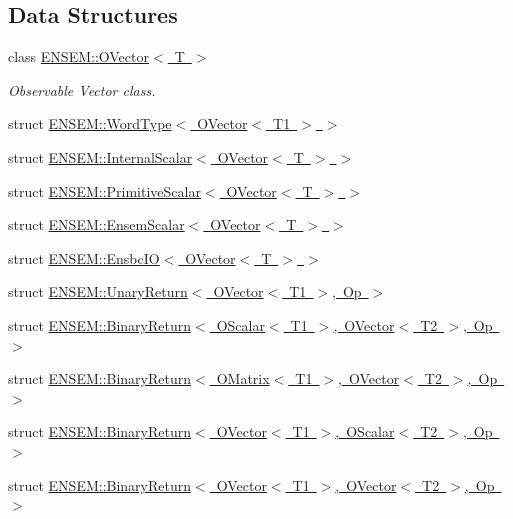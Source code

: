 \subsection*{Data Structures}
\begin{DoxyCompactItemize}
\item 
class \mbox{\hyperlink{classENSEM_1_1OVector}{E\+N\+S\+E\+M\+::\+O\+Vector$<$ T $>$}}
\begin{DoxyCompactList}\small\item\em Observable Vector class. \end{DoxyCompactList}\item 
struct \mbox{\hyperlink{structENSEM_1_1WordType_3_01OVector_3_01T1_01_4_01_4}{E\+N\+S\+E\+M\+::\+Word\+Type$<$ O\+Vector$<$ T1 $>$ $>$}}
\item 
struct \mbox{\hyperlink{structENSEM_1_1InternalScalar_3_01OVector_3_01T_01_4_01_4}{E\+N\+S\+E\+M\+::\+Internal\+Scalar$<$ O\+Vector$<$ T $>$ $>$}}
\item 
struct \mbox{\hyperlink{structENSEM_1_1PrimitiveScalar_3_01OVector_3_01T_01_4_01_4}{E\+N\+S\+E\+M\+::\+Primitive\+Scalar$<$ O\+Vector$<$ T $>$ $>$}}
\item 
struct \mbox{\hyperlink{structENSEM_1_1EnsemScalar_3_01OVector_3_01T_01_4_01_4}{E\+N\+S\+E\+M\+::\+Ensem\+Scalar$<$ O\+Vector$<$ T $>$ $>$}}
\item 
struct \mbox{\hyperlink{structENSEM_1_1EnsbcIO_3_01OVector_3_01T_01_4_01_4}{E\+N\+S\+E\+M\+::\+Ensbc\+I\+O$<$ O\+Vector$<$ T $>$ $>$}}
\item 
struct \mbox{\hyperlink{structENSEM_1_1UnaryReturn_3_01OVector_3_01T1_01_4_00_01Op_01_4}{E\+N\+S\+E\+M\+::\+Unary\+Return$<$ O\+Vector$<$ T1 $>$, Op $>$}}
\item 
struct \mbox{\hyperlink{structENSEM_1_1BinaryReturn_3_01OScalar_3_01T1_01_4_00_01OVector_3_01T2_01_4_00_01Op_01_4}{E\+N\+S\+E\+M\+::\+Binary\+Return$<$ O\+Scalar$<$ T1 $>$, O\+Vector$<$ T2 $>$, Op $>$}}
\item 
struct \mbox{\hyperlink{structENSEM_1_1BinaryReturn_3_01OMatrix_3_01T1_01_4_00_01OVector_3_01T2_01_4_00_01Op_01_4}{E\+N\+S\+E\+M\+::\+Binary\+Return$<$ O\+Matrix$<$ T1 $>$, O\+Vector$<$ T2 $>$, Op $>$}}
\item 
struct \mbox{\hyperlink{structENSEM_1_1BinaryReturn_3_01OVector_3_01T1_01_4_00_01OScalar_3_01T2_01_4_00_01Op_01_4}{E\+N\+S\+E\+M\+::\+Binary\+Return$<$ O\+Vector$<$ T1 $>$, O\+Scalar$<$ T2 $>$, Op $>$}}
\item 
struct \mbox{\hyperlink{structENSEM_1_1BinaryReturn_3_01OVector_3_01T1_01_4_00_01OVector_3_01T2_01_4_00_01Op_01_4}{E\+N\+S\+E\+M\+::\+Binary\+Return$<$ O\+Vector$<$ T1 $>$, O\+Vector$<$ T2 $>$, Op $>$}}

\end{DoxyCompactItemize}

